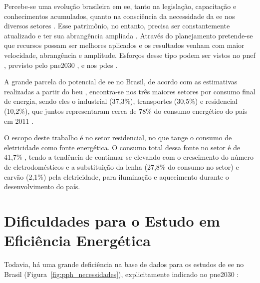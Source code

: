 Percebe-se uma evolução brasileira em \gls{ee}, tanto na legislação,
capacitação e conhecimentos acumulados, quanto na consciência da
necessidade da \gls{ee} nos diversos setores \cite{pnef}.  Esse
patrimônio, no entanto, precisa ser constantemente atualizado e ter
sua abrangência ampliada \cite{pne30_eff_energ}. Através do
planejamento pretende-se que recursos possam ser melhores aplicados e
os resultados venham com maior velocidade, abrangência e amplitude.
Esforços desse tipo podem ser vistos no \gls{pnef} \cite{pnef},
previsto pelo \gls{pne2030} \cite{pne30_eff_energ}, e nos \glspl{pde}
\cite{pde_2020}.

A grande parcela do potencial de \gls{ee} no Brasil, de acordo com as
estimativas realizadas a partir do \gls{beu} \cite{beu}, encontra-se
nos três maiores setores por consumo final de energia, sendo eles o
industrial (37,3\%), transportes (30,5\%) e residencial (10,2\%), que
juntos representaram cerca de 78\% do consumo energético do país em
2011 \cite{ben2012,epe_eficiencia_2012}.

O escopo deste trabalho é no setor residencial, no que tange o consumo
de eletricidade como fonte energética. O consumo total dessa fonte no
setor é de 41,7\% \cite{ben2012}, tendo a tendência de continuar se
elevando com o crescimento do número de eletrodomésticos e a
substituição da lenha (27,8\% do consumo no setor) e carvão (2,1\%)
pela eletricidade, para iluminação e aquecimento durante o
desenvolvimento do país.

\section{Dificuldades para o Estudo em Eficiência Energética}
\label{sec:ee_dificuldades}

Todavia, há uma grande deficiência na base de dados para os estudos de \gls{ee}
no Brasil (Figura~\ref{fig:pph_necessidades}), explicitamente indicado no
\gls{pne2030} \cite[pp.~232]{pne30_eff_energ}:


